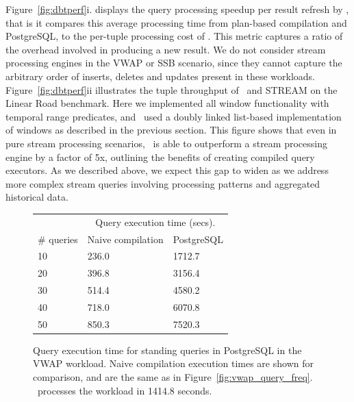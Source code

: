Figure~\ref{fig:dbtperf}i. displays the query processing speedup per result
refresh by \compiler, that is it compares this average processing time from
plan-based compilation and PostgreSQL, to the per-tuple processing cost of
\compiler. This metric captures a ratio of the overhead involved in producing a
new result. We do not consider stream processing engines in the VWAP or SSB
scenario, since they cannot capture the arbitrary order of inserts, deletes and
updates present in these workloads.
Figure~\ref{fig:dbtperf}ii illustrates the tuple throughput of \compiler\ and
STREAM on the Linear Road benchmark. Here we implemented all window functionality
with temporal range predicates, and \compiler\ used a doubly linked list-based
implementation of windows as described in the previous section. This figure shows
that even in pure stream processing scenarios, \compiler\ is able to outperform a
stream processing engine by a factor of 5x, outlining the benefits of creating
compiled query executors. As we described above, we expect this gap to widen as
we address more complex stream queries involving processing patterns and
aggregated historical data.



\begin{figure}[htb]
\begin{center}
\begin{tabular}{|l|l|l|}
\hline
& \multicolumn{2}{c|}{Query execution time (secs).} \\
\# queries & Naive compilation & PostgreSQL \\
\hline
10 & 236.0 & 1712.7 \\
20 & 396.8 & 3156.4 \\
30 & 514.4 & 4580.2 \\
40 & 718.0 & 6070.8 \\
50 & 850.3 & 7520.3 \\
\hline 
\end{tabular}
\end{center}
\vspace{-4mm}
\caption{Query execution time for standing queries in PostgreSQL in the VWAP
workload. Naive compilation execution times are shown for comparison, and are
the same as in Figure~\ref{fig:vwap_query_freq}. \compiler\ processes the
workload in 1414.8 seconds.}
\label{tab:ssb_query_freq}
\end{figure}

